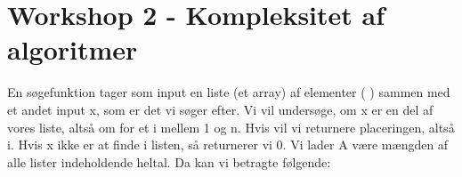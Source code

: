 \documentclass{article}
\begin{document}
\lstset{basicstyle=\ttfamily,breaklines=true,columns=flexible}
\pagestyle{empty}
\begin{Maple Normal}{
}\end{Maple Normal}
\section{\textbf{Workshop 2 - Kompleksitet af algoritmer}}
\begin{Maple Normal}{
En søgefunktion tager som input en liste (et array) af elementer (
)\linebreak
sammen med et andet input x, som er det vi søger efter. Vi vil undersøge,\linebreak
om x er en del af vores liste, altså om 
 for et i mellem 1 og n. Hvis\linebreak
{}
 vil vi returnere placeringen, altså i. Hvis x ikke er at finde i listen, så\linebreak
returnerer vi 0. Vi lader A være mængden af alle lister indeholdende heltal.\linebreak
Da kan vi betragte følgende:\linebreak
}\end{Maple Normal}
\end{document}
